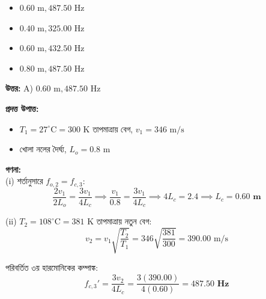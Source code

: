 \documentclass[12pt, a4paper]{article}
\begin{document}
\begin{itemize}[label={}, leftmargin=1cm, itemsep=0.5em]
    \item[\textbf{A)}] $0.60\text{ m}, 487.50\text{ Hz}$
    \item[\textbf{B)}] $0.40\text{ m}, 325.00\text{ Hz}$
    \item[\textbf{C)}] $0.60\text{ m}, 432.50\text{ Hz}$
    \item[\textbf{D)}] $0.80\text{ m}, 487.50\text{ Hz}$
\end{itemize}

\vspace{0.5em}
\begin{tcolorbox}[answerbox]
    \textbf{\color{success} উত্তর:} A) $0.60\text{ m}, 487.50\text{ Hz}$
\end{tcolorbox}
\vspace{1em}

\begin{tcolorbox}[solutionbox={সমাধান (Solution)}]
    \noindent
    \textbf{প্রদত্ত উপাত্ত:}
    \begin{itemize}[leftmargin=1.5em, itemsep=0.2em]
        \item $T_1 = 27^\circ\text{C} = 300\text{ K}$ তাপমাত্রায় বেগ, $v_1 = 346\text{ m/s}$
        \item খোলা নলের দৈর্ঘ্য, $L_o = 0.8\text{ m}$
    \end{itemize}

    \vspace{0.6em}
    \noindent\textbf{গণনা:} \\
    (i) শর্তানুসারে $f_{o,2} = f_{c,3}$:
    \[ \frac{2v_1}{2 L_o} = \frac{3 v_1}{4 L_c} \implies \frac{v_1}{0.8} = \frac{3 v_1}{4 L_c} \implies 4 L_c = 2.4 \implies L_c = \mathbf{0.60\text{ m}} \]
    
    (ii) $T_2 = 108^\circ\text{C} = 381\text{ K}$ তাপমাত্রায় নতুন বেগ:
    \[ v_2 = v_1 \sqrt{\frac{T_2}{T_1}} = 346 \sqrt{\frac{381}{300}} = 390.00\text{ m/s} \]
    
    পরিবর্তিত ৩য় হারমোনিকের কম্পাঙ্ক:
    \[ f_{c,3}' = \frac{3 v_2}{4 L_c} = \frac{3(390.00)}{4(0.60)} = \mathbf{487.50\text{ Hz}} \]
\end{tcolorbox}
\end{document}
